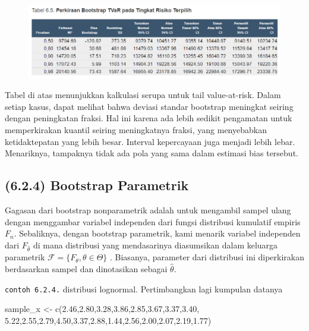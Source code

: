 \documentclass[
]{book}
\newenvironment{Shaded}{\begin{snugshade}}{\end{snugshade}}
\newcommand{\FloatTok}[1]{\textcolor[rgb]{0.00,0.00,0.81}{#1}}
\newcommand{\FunctionTok}[1]{\textcolor[rgb]{0.00,0.00,0.00}{#1}}
\newcommand{\NormalTok}[1]{#1}
\newcommand{\OtherTok}[1]{\textcolor[rgb]{0.56,0.35,0.01}{#1}}
\begin{document}
\begin{figure}

{\centering \includegraphics[width=1\linewidth]{images/6.2.3-2} 

}

\end{figure}

Tabel di atas menunjukkan kalkulasi serupa untuk tail value-at-risk. Dalam setiap kasus, dapat melihat bahwa deviasi standar bootstrap meningkat seiring dengan peningkatan fraksi. Hal ini karena ada lebih sedikit pengamatan untuk memperkirakan kuantil seiring meningkatnya fraksi, yang menyebabkan ketidaktepatan yang lebih besar. Interval kepercayaan juga menjadi lebih lebar. Menariknya, tampaknya tidak ada pola yang sama dalam estimasi bias tersebut.

\hypertarget{bootstrap-parametrik}{%
\subsection{(6.2.4) Bootstrap Parametrik}\label{bootstrap-parametrik}}

Gagasan dari bootstrap nonparametrik adalah untuk mengambil sampel ulang dengan menggambar variabel independen dari fungsi distribusi kumulatif empiris \(F_n\). Sebaliknya, dengan bootstrap parametrik, kami menarik variabel independen dari \(F_{\widehat{\theta}}\) di mana distribusi yang mendasarinya diasumsikan dalam keluarga parametrik \(\mathcal{F}=\{F_{\theta},\theta\in\Theta\}\) . Biasanya, parameter dari distribusi ini diperkirakan berdasarkan sampel dan dinotasikan sebagai \(\hat{\theta}\).

\texttt{contoh\ 6.2.4.} distribusi lognormal. Pertimbangkan lagi kumpulan datanya

\begin{Shaded}
\begin{Highlighting}[]
\NormalTok{sample\_x }\OtherTok{\textless{}{-}} \FunctionTok{c}\NormalTok{(}\FloatTok{2.46}\NormalTok{,}\FloatTok{2.80}\NormalTok{,}\FloatTok{3.28}\NormalTok{,}\FloatTok{3.86}\NormalTok{,}\FloatTok{2.85}\NormalTok{,}\FloatTok{3.67}\NormalTok{,}\FloatTok{3.37}\NormalTok{,}\FloatTok{3.40}\NormalTok{,}
              \FloatTok{5.22}\NormalTok{,}\FloatTok{2.55}\NormalTok{,}\FloatTok{2.79}\NormalTok{,}\FloatTok{4.50}\NormalTok{,}\FloatTok{3.37}\NormalTok{,}\FloatTok{2.88}\NormalTok{,}\FloatTok{1.44}\NormalTok{,}\FloatTok{2.56}\NormalTok{,}\FloatTok{2.00}\NormalTok{,}\FloatTok{2.07}\NormalTok{,}\FloatTok{2.19}\NormalTok{,}\FloatTok{1.77}\NormalTok{)}
\end{Highlighting}
\end{Shaded}
\end{document}
